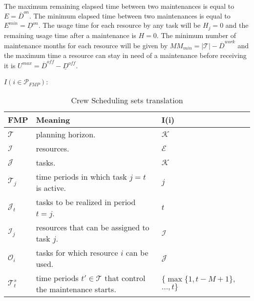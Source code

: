 \documentclass[a4paper,11pt]{article}
\begin{document}
    The maximum remaining elapsed time between two maintenances is equal to $E = \overline{D}^{on}$. The minimum elapsed time between two maintenances is equal to $E^{min}=\underline{D}^{on}$.
    The usage time for each resource by any task will be $H_j = 0$ and the remaining usage time after a maintenance is $H = 0$. The minimum number of maintenance months for each resource will be given by $MM_{min}=|\mathcal{T}| - \overline{D}^{work}$ and the maximum time a resource can stay in need of a maintenance before receiving it is $U^{max} = \overline{D}^{off} - \underline{D}^{off}$.
    
    \vskip 0.3cm

    $I(i \in \mathcal{P}_{FMP})$:

    \begin{table}
        \begin{tabular}{l|l|p{40mm}}
            \textbf{FMP}        &  \textbf{Meaning} & \textbf{I(i)} \\ \hline
            $\mathcal{T}$       &  planning horizon. & $ \mathcal{K} $ \\
            $\mathcal{I}$       &  resources. & $ \mathcal{E} $ \\
            $\mathcal{J}$       &  tasks.  & $ \mathcal{K} $ \\
            $\mathcal{T}_j$     &  time periods in which task $j=t$ is active. & $ j $ \\
            $\mathcal{J}_t$     &  tasks to be realized in period $t=j$. & $ t $ \\
            $\mathcal{I}_j$     &  resources that can be assigned to task $j$. & $ \mathcal{I} $\\
            $\mathcal{O}_i$     &  tasks for which resource $i$ can be used. & $ \mathcal{J} $ \\
            $\mathcal{T}^{s}_t$ &  time periods $t' \in \mathcal{T}$ that control the maintenance starts. & $\{ \max{\{1, t - M+1\}}, $ $ ..., {t}\}$ \\
        \end{tabular}
         \caption{Crew Scheduling sets translation}
        \label{tab:sets_crew}
    \end{table}


    \vskip 0.3cm

\end{document}
